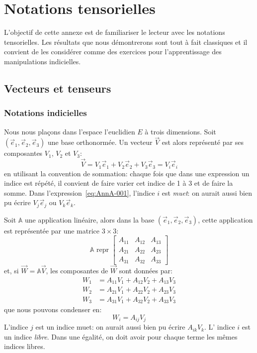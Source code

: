 \chapter{Notations tensorielles} \label{Ann:A}
L'objectif de cette annexe est de familiariser le lecteur avec les notations tensorielles.
Les résultats que nous démontrerons sont tout à fait classiques et il convient de les considérer comme des exercices pour l'apprentissage des manipulations indicielles.
\section{Vecteurs et tenseurs}
\subsection{Notations indicielles}
Nous nous plaçons dans l'espace l'euclidien $E$ à trois dimensions.
Soit $(\vec{e}_1,\vec{e}_2,\vec{e}_3)$ une base orthonormée.
Un vecteur $\vec{V}$ est alors représenté par ses composantes $V_1$, $V_2$ et $V_3$:
\begin{equation}
    \vec{V} = V_1 \vec{e}_1 + V_2 \vec{e}_2 + V_3 \vec{e}_3 = V_i \vec{e}_i
    \label{eq:AnnA-001}
\end{equation}
en utilisant la convention de sommation: chaque fois que dans une expression un indice est répété, il convient de faire varier cet indice de 1 à 3 et de faire la somme.
Dans l'expression~\eqref{eq:AnnA-001}, l'indice $i$ est \emph{muet}: on aurait aussi bien pu écrire $V_j \vec{e}_j$ ou $V_k \vec{e}_k$.

Soit $\mathbb{A}$ une application linéaire, alors dans la base $(\vec{e}_1,\vec{e}_2,\vec{e}_3)$, cette application est représentée par une matrice $3\times3$:
\begin{equation}
    \mathbb{A} \text{ repr } 
    \begin{bmatrix}
        A_{11} & A_{12} & A_{13} \\    
        A_{21} & A_{22} & A_{23} \\    
        A_{31} & A_{32} & A_{33} 
    \end{bmatrix}
    \label{eq:AnnA-002}
\end{equation}
et, si $\vec{W} = \mathbb{A} \vec{V}$, les composantes de $\vec{W}$ sont données par:
\begin{align*}
    W_1 &= A_{11} V_1 + A_{12} V_2 + A_{13} V_3\\
    W_2 &= A_{21} V_1 + A_{22} V_2 + A_{23} V_3\\
    W_3 &= A_{31} V_1 + A_{32} V_2 + A_{33} V_3
\end{align*}
que nous pouvons condenser en:
\begin{equation}
    W_i = A_{ij} V_j
    \label{eq:AnnA-003}
\end{equation}
L'indice $j$ est un indice muet: on aurait aussi bien pu écrire $A_{ik} V_k$.
L' indice $i$ est un indice \emph{libre}.
Dans une égalité, on doit avoir pour chaque terme les mêmes indices libres.

